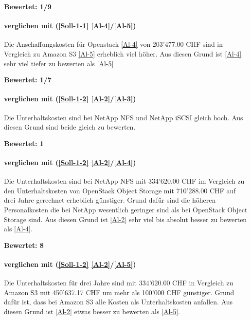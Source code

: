 \textbf{Bewertet: 1/9}


\paragraph*{  verglichen mit  (\ref{Soll-1-1} \ref{Al-4}/\ref{Al-5})}
Die Anschaffungskosten für Openstack \ref{Al-4} von 203’477.00 CHF sind in Vergleich zu Amazon S3 \ref{Al-5} erheblich viel höher.
Aus diesen Grund ist \ref{Al-4} sehr viel tiefer zu bewerten als \ref{Al-5}

\textbf{Bewertet: 1/7}

\paragraph*{  verglichen mit  (\ref{Soll-1-2} \ref{Al-2}/\ref{Al-3})}
Die Unterhaltskosten sind bei NetApp NFS und NetApp iSCSI gleich hoch. Aus diesen Grund sind beide gleich zu bewerten.

\textbf{Bewertet: 1}

\paragraph*{  verglichen mit  (\ref{Soll-1-2} \ref{Al-2}/\ref{Al-4})}
Die Unterhaltskosten sind bei NetApp NFS mit 334’620.00 CHF im Vergleich zu den Unterhaltskosten von OpenStack Object Storage mit 710’288.00 CHF auf drei Jahre gerechnet erheblich günstiger. Grund dafür sind die höheren Personalkosten die bei NetApp wesentlich geringer sind als bei OpenStack Object Storage sind. Aus diesen Grund ist  \ref{Al-2} sehr viel bis absolut besser zu bewerten als  \ref{Al-4}.

\textbf{Bewertet: 8}

\paragraph*{  verglichen mit  (\ref{Soll-1-2} \ref{Al-2}/\ref{Al-5})}
Die Unterhaltskosten für drei Jahre sind mit 334’620.00 CHF in Vergleich zu Amazon S3 mit 450'637.17 CHF um mehr als 100'000 CHF günstiger. Grund dafür ist, dass bei Amazon S3 alle Kosten als Unterhaltskosten anfallen.
Aus diesen Grund ist  \ref{Al-2} etwas besser zu bewerten als  \ref{Al-5}.

